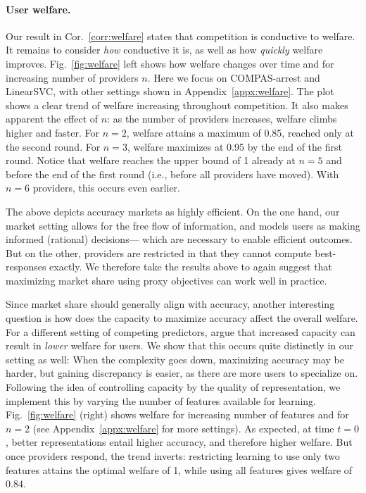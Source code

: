 \paragraph{User welfare.}
Our result in Cor.~\ref{corr:welfare} states that competition is conductive to welfare.
It remains to consider \emph{how} conductive it is,
as well as how \emph{quickly} welfare improves.
Fig.~\ref{fig:welfare} left shows how welfare changes over time
and for increasing number of providers $n$.
Here we focus on COMPAS-arrest and LinearSVC,
with other settings shown in Appendix~\ref{appx:welfare}.
The plot shows a clear trend of welfare increasing throughout competition.
It also makes apparent the effect of $n$:
as the number of providers increases, welfare climbs higher and faster.
For $n=2$, welfare attains a maximum of 0.85,
reached only at the second round.
For $n=3$, welfare maximizes at 0.95 by the end of the first round.
Notice that welfare reaches the upper bound of 1 already at $n=5$
and before the end of the first round (i.e., before all providers have moved).
With $n=6$ providers, this occurs even earlier.

The above depicts accuracy markets as highly efficient.
On the one hand, our market setting allows for the free flow of information,
and models users as making informed (rational) decisions---%
which are necessary to enable efficient outcomes.
But on the other, providers are restricted in that they cannot compute best-responses exactly.
We therefore take the results above to again suggest that maximizing market share using proxy objectives can work well in practice.

Since market share should generally align with accuracy,
another interesting question is how does the capacity to maximize accuracy affect the overall welfare.
For a different setting of competing predictors,
\citet{jagadeesan2024improved} argue that increased capacity can result in \emph{lower} welfare for users.
We show that this occurs quite distinctly in our setting as well:
When the complexity goes down, maximizing accuracy may be harder, but gaining discrepancy is easier, as there are more users to specialize on.
Following the idea of controlling capacity by the quality of representation,
we implement this by varying the number of features available for learning.
Fig.~\ref{fig:welfare} (right) shows welfare for increasing number of features
and for $n=2$ (see Appendix~\ref{appx:welfare} for more settings).
As expected, at time $t=0$, better representations entail higher accuracy, and therefore higher welfare.
But once providers respond, the trend inverts: 
restricting learning to use only two features attains the optimal welfare of 1, while using all features gives welfare of $0.84$. 

